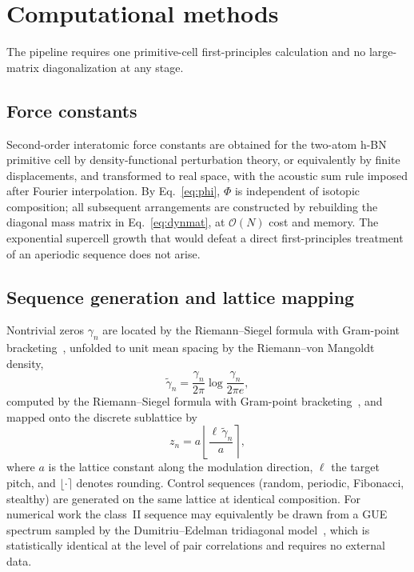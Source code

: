 \documentclass[
  aps,
  prl,
  reprint,
  amsmath,
  amssymb,
  superscriptaddress,
  floatfix,
  nofootinbib
]{revtex4-2}
\begin{document}
\section{Computational methods}
\label{sec:methods}

The pipeline requires one primitive-cell first-principles calculation and no
large-matrix diagonalization at any stage.

\subsection{Force constants}

Second-order interatomic force constants are obtained for the two-atom h-BN
primitive cell by density-functional perturbation theory, or equivalently by
finite displacements, and transformed to real space, with the acoustic sum
rule imposed after Fourier interpolation. By Eq.~\eqref{eq:phi}, $\Phi$ is
independent of isotopic composition; all subsequent arrangements are
constructed by rebuilding the diagonal mass matrix in
Eq.~\eqref{eq:dynmat}, at $\mathcal{O}(N)$ cost and memory. The exponential
supercell growth that would defeat a direct first-principles treatment of an
aperiodic sequence does not arise.

\subsection{Sequence generation and lattice mapping}

Nontrivial zeros $\gamma_n$ are located by the Riemann--Siegel formula with
Gram-point bracketing~\cite{Edwards1974}, unfolded to unit mean spacing by the
Riemann--von Mangoldt density,
\begin{equation}
  \tilde\gamma_n=\frac{\gamma_n}{2\pi}\log\frac{\gamma_n}{2\pi e},
  \label{eq:unfold}
\end{equation}
computed by the Riemann--Siegel formula with Gram-point
bracketing~\cite{Edwards1974}, and mapped onto the discrete sublattice by
\begin{equation}
  z_n=a\left\lfloor \frac{\ell\,\tilde\gamma_n}{a}\right\rceil,
  \label{eq:mapping}
\end{equation}
where $a$ is the lattice constant along the modulation direction, $\ell$ the
target pitch, and $\lfloor\cdot\rceil$ denotes rounding. Control sequences (random, periodic, Fibonacci, stealthy) are generated on the
same lattice at identical composition. For numerical work the class~II
sequence may equivalently be drawn from a GUE spectrum sampled by the
Dumitriu--Edelman tridiagonal model~\cite{Dumitriu2002}, which is
statistically identical at the level of pair correlations and requires no
external data.
\end{document}
